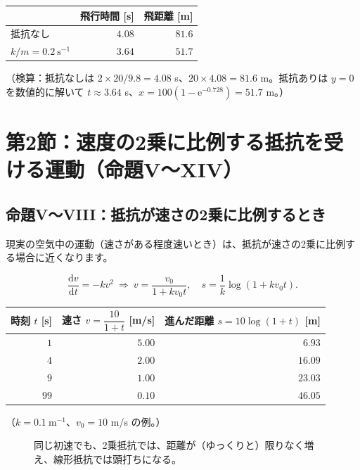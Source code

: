 \documentclass[a4paper,11pt,openany]{ltjsbook}
\newcommand{\dd}{\mathrm{d}}
\newcommand{\ee}{\mathrm{e}}
\begin{document}
\begin{center}
\begin{tabular}{lrr}
\toprule
 & 飛行時間 [s] & 飛距離 [m]\\
\midrule
抵抗なし & $4.08$ & $81.6$\\
$k/m=0.2\ \mathrm{s^{-1}}$ & $3.64$ & $51.7$\\
\bottomrule
\end{tabular}
\end{center}

（検算：抵抗なしは $2\times20/9.8=4.08$ s、$20\times4.08=81.6$ m。抵抗ありは $y=0$ を数値的に解いて $t\approx3.64$ s、$x=100(1-\ee^{-0.728})=51.7$ m。）

\section{第2節：速度の2乗に比例する抵抗を受ける運動（命題V〜XIV）}

\subsection{命題V〜VIII：抵抗が速さの2乗に比例するとき}

現実の空気中の運動（速さがある程度速いとき）は、抵抗が速さの2乗に比例する場合に近くなります。

\[
\frac{\dd v}{\dd t}=-kv^2\ \Longrightarrow\ v=\frac{v_0}{1+kv_0t},\quad s=\frac1k\log(1+kv_0t).
\]

\begin{center}
\begin{tabular}{rrr}
\toprule
時刻 $t$ [s] & 速さ $v=\dfrac{10}{1+t}$ [m/s] & 進んだ距離 $s=10\log(1+t)$ [m]\\
\midrule
$1$ & $5.00$ & $6.93$\\
$4$ & $2.00$ & $16.09$\\
$9$ & $1.00$ & $23.03$\\
$99$ & $0.10$ & $46.05$\\
\bottomrule
\end{tabular}
\end{center}

（$k=0.1\ \mathrm{m^{-1}}$、$v_0=10$ m/s の例。）

\begin{figure}[htbp]
\centering
{}
\caption{同じ初速でも、2乗抵抗では、距離が（ゆっくりと）限りなく増え、線形抵抗では頭打ちになる。}
\end{figure}
\end{document}
